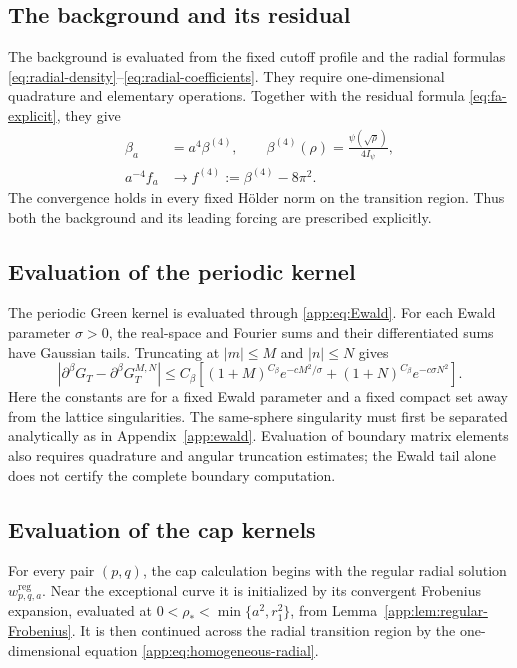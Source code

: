 \documentclass[11pt,a4paper,twoside]{article}
\numberwithin{equation}{section}
\theoremstyle{definition}
\theoremstyle{remark}
\begin{document}
\subsection{The background and its residual}
\label{subsec:computing-background}
The background is evaluated from the fixed cutoff profile and the
radial formulas \eqref{eq:radial-density}--\eqref{eq:radial-coefficients}. They require
one-dimensional quadrature and elementary operations. Together with
the residual formula \eqref{eq:fa-explicit}, they give
\[
\begin{aligned}
\beta_a&=a^4\beta^{(4)},
\qquad \beta^{(4)}(\rho)=\frac{\psi(\sqrt\rho)}{4I_\psi},\\
a^{-4}f_a&\longrightarrow f^{(4)}:=\beta^{(4)}-8\pi^2.
\end{aligned}
\]
The convergence holds in every fixed H\"older norm on the transition
region. Thus both
the background and its leading forcing are prescribed explicitly.


\subsection{Evaluation of the periodic kernel}
\label{subsec:evaluate-Ewald}

The periodic Green kernel is evaluated through
\eqref{app:eq:Ewald}. For each Ewald parameter \(\sigma>0\),
the real-space and Fourier sums and their differentiated sums have
Gaussian tails. Truncating at \(|m|\le M\) and \(|n|\le N\) gives
\[
\left|
\partial^\beta G_T
-
\partial^\beta G_T^{M,N}
\right|
\le
C_\beta
\left[
(1+M)^{C_\beta}
e^{-cM^2/\sigma}
+
(1+N)^{C_\beta}
e^{-c\sigma N^2}
\right].
\]
Here the constants are for a fixed Ewald parameter and a fixed
compact set away from the lattice singularities. The same-sphere
singularity must first be separated analytically as in
Appendix~\ref{app:ewald}. Evaluation of boundary matrix elements
also requires quadrature and angular truncation estimates; the Ewald
tail alone does not certify the complete boundary computation.

\subsection{Evaluation of the cap kernels}
\label{subsec:evaluate-cap-kernels}

For every pair \((p,q)\), the cap calculation begins with the regular
radial solution \(w_{p,q,a}^{\mathrm{reg}}.\) Near the exceptional curve it is initialized by its convergent
Frobenius expansion, evaluated at \(0<\rho_*<\min\{a^2,r_1^2\}\), from
Lemma~\ref{app:lem:regular-Frobenius}.  It is then continued across
the radial transition region by the one-dimensional equation
\eqref{app:eq:homogeneous-radial}.
\end{document}
